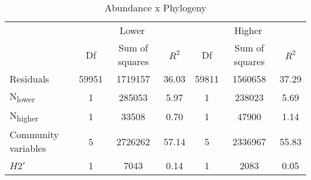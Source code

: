 \documentclass[12pt,a4paper]{article}
\begin{document}
\begin{table}
\medskip
    \begin{subtable}{\linewidth}
    \caption{Abundance x Phylogeny}
    \centering
\begin{tabularx}{\linewidth}{@{} X *6{c} @{}}
\toprule
  & \multicolumn{3}{c}{Lower} & \multicolumn{3}{c}{Higher} \\ \cmidrule(l){2-4} \cmidrule(l){5-7}
  						& Df		& Sum of squares	& $R^2$	& Df 	& Sum of squares	& $R^2$ \\ \midrule
Residuals 				& 59951 & 1719157		& 36.03	& 59811 & 1560658			& 37.29   \\
N\textsubscript{lower} 	& 1 		& 285053			& 5.97 	& 1		& 238023 			& 5.69  \\
N\textsubscript{higher} 	& 1 		& 33508			& 0.70	& 1 		& 47900 			& 1.14  \\
Community variables 		& 5 		& 2726262 		& 57.14 	& 5 		& 2336967			& 55.83  \\
$H2'$ 					& 1 		& 7043			& 0.14 	& 1 		& 2083			& 0.05  \\ \bottomrule
\end{tabularx}
\end{subtable}
\end{table}



\newpage
\begin{multicols}{2}[\printbibheading]
\printbibliography[heading=none]
\end{multicols}
\end{document}
